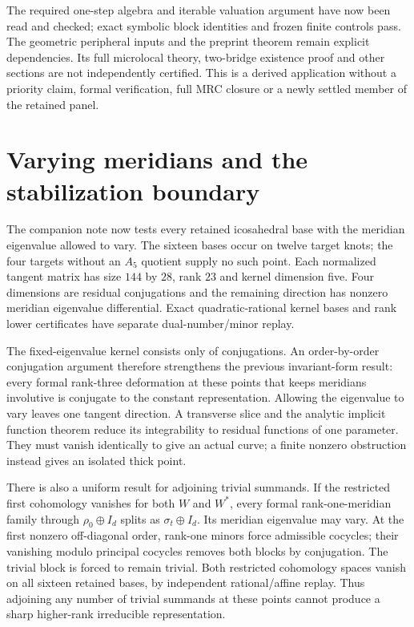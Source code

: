 \documentclass[11pt]{article}
\begin{document}
The required one-step algebra and iterable valuation argument have
now been read and checked; exact symbolic block identities and
frozen finite controls pass. The geometric peripheral inputs and
the preprint theorem remain explicit dependencies. Its full
microlocal theory, two-bridge existence proof and other sections
are not independently certified. This is a derived application
without a priority claim, formal verification, full MRC closure
or a newly settled member of the retained panel.

\clearpage
\section{Varying meridians and the stabilization boundary}

The companion note
 now tests every
retained icosahedral base with the meridian eigenvalue allowed to
vary. The sixteen bases occur on twelve target knots; the four
targets without an $A_5$ quotient supply no such point.
Each normalized tangent matrix has size $144$ by $28$, rank $23$
and kernel dimension five. Four dimensions are residual
conjugations and the remaining direction has nonzero meridian
eigenvalue differential. Exact quadratic-rational kernel bases and
rank lower certificates have separate dual-number/minor replay.

The fixed-eigenvalue kernel consists only of conjugations. An
order-by-order conjugation argument therefore strengthens the
previous invariant-form result: every formal rank-three deformation
at these points that keeps meridians involutive is conjugate to the
constant representation. Allowing the eigenvalue to vary leaves
one tangent direction. A transverse slice and the analytic implicit
function theorem reduce its integrability to residual functions of
one parameter. They must vanish identically to give an actual curve;
a finite nonzero obstruction instead gives an isolated thick point.

There is also a uniform result for adjoining trivial summands. If
the restricted first cohomology vanishes for both $W$ and $W^*$,
every formal rank-one-meridian family through $\rho_0\oplus I_d$
splits as $\sigma_t\oplus I_d$. Its meridian eigenvalue may vary.
At the first nonzero off-diagonal order, rank-one minors force
admissible cocycles; their vanishing modulo principal cocycles
removes both blocks by conjugation. The trivial block is forced to
remain trivial. Both restricted cohomology spaces vanish on all
sixteen retained bases, by independent rational/affine replay.
Thus adjoining any number of trivial summands at these points
cannot produce a sharp higher-rank irreducible representation.
\end{document}
